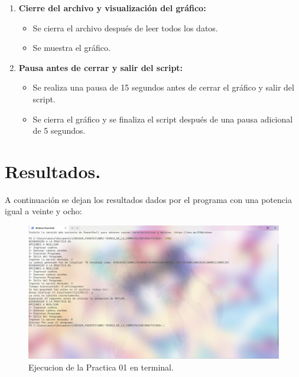 \documentclass{article}
\begin{document}
\begin{enumerate}
                \item \textbf{Cierre del archivo y visualización del gráfico:}
                \begin{itemize}
                    \item Se cierra el archivo después de leer todos los datos.
                    \item Se muestra el gráfico.
                \end{itemize}

                \item \textbf{Pausa antes de cerrar y salir del script:}
                \begin{itemize}
                    \item Se realiza una pausa de 15 segundos antes de cerrar el gráfico y salir del script.
                    \item Se cierra el gráfico y se finaliza el script después de una pausa adicional de 5 segundos.
                \end{itemize}
            \end{enumerate}

\section{Resultados.}
A continuación se dejan los resultados dados por el
programa con una potencia igual a veinte y ocho:
\begin{figure}[H]
    \centering
    \includegraphics[width=1\linewidth]{Terminal.png}
    \caption{Ejecucion de la Practica 01 en terminal.}\label{Terminal}
\end{figure}
\end{document}
